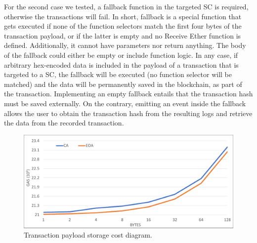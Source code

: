 For the second case we tested, a fallback function in the targeted SC is required, otherwise the transactions will fail. In short, fallback is a special function that gets executed if none of the function selectors match the first four bytes of the transaction payload, or if the latter is empty and no Receive Ether function is defined. Additionally, it cannot have parameters nor return anything. The body of the fallback could either be empty or include function logic. In any case, if arbitrary hex-encoded data is included in the payload of a transaction that is targeted to a SC, the fallback will be executed (no function selector will be matched) and the data will be permanently saved in the blockchain, as part of the transaction. Implementing an empty fallback entails that the transaction hash must be saved externally. On the contrary, emitting an event inside the fallback allows the user to obtain the transaction hash from the resulting logs and retrieve the data from the recorded transaction.

\begin{figure}[htbp]
\centerline{\includegraphics[width=\textwidth]{figs/tx.pdf}}
\caption{Transaction payload storage cost diagram.}
\label{fig:tx}
\end{figure}

